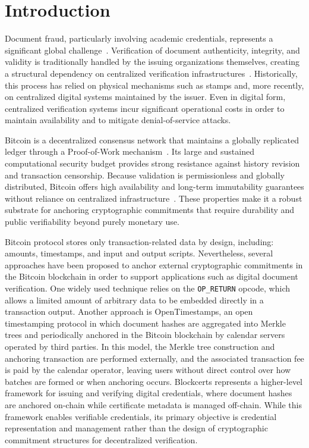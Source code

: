 \documentclass[preprint,12pt]{elsarticle}
\begin{document}


\section{Introduction}
\label{sec.intro}

Document fraud, particularly involving academic credentials, represents a significant global challenge~\cite{Xie2020EthereumCertificate}. 
Verification of document authenticity, integrity, and validity is traditionally handled by the issuing organizations themselves, creating a structural dependency on centralized verification infrastructures~\cite{shende2024enhancing}. 
Historically, this process has relied on physical mechanisms such as stamps and, more recently, on centralized digital systems maintained by the issuer. 
Even in digital form, centralized verification systems incur significant operational costs in order to maintain availability and to mitigate denial-of-service attacks.

Bitcoin is a decentralized consensus network that maintains a globally replicated ledger through a Proof-of-Work mechanism~\cite{nakamoto2008bitcoin}. 
Its large and sustained computational security budget provides strong resistance against history revision and transaction censorship. 
Because validation is permissionless and globally distributed, Bitcoin offers high availability and long-term immutability guarantees without reliance on centralized infrastructure~\cite{Lemieux2016Trusting}. 
These properties make it a robust substrate for anchoring cryptographic commitments that require durability and public verifiability beyond purely monetary use.

Bitcoin protocol stores only transaction-related data by design, including: amounts, timestamps, and input and output scripts. 
Nevertheless, several approaches have been proposed to anchor external cryptographic commitments in the Bitcoin blockchain in order to support applications such as digital document verification. 
One widely used technique relies on the \texttt{OP\_RETURN} opcode, which allows a limited amount of arbitrary data to be embedded directly in a transaction output. 
Another approach is OpenTimestamps, an open timestamping protocol in which document hashes are aggregated into Merkle trees and periodically anchored in the Bitcoin blockchain by calendar servers operated by third parties. 
In this model, the Merkle tree construction and anchoring transaction are performed externally, and the associated transaction fee is paid by the calendar operator, leaving users without direct control over how batches are formed or when anchoring occurs. 
Blockcerts represents a higher-level framework for issuing and verifying digital credentials, where document hashes are anchored on-chain while certificate metadata is managed off-chain. While this framework enables verifiable credentials, its primary objective is credential representation and management rather than the design of cryptographic commitment structures for decentralized verification.
\end{document}
